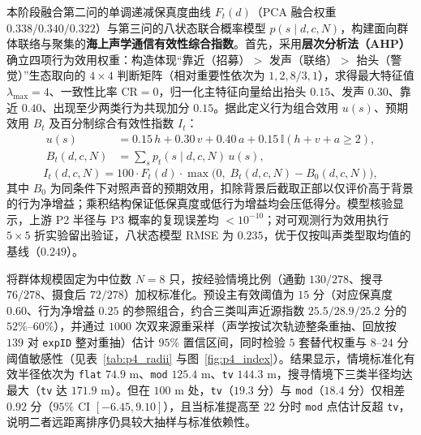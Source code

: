 \documentclass{apmcmthesis}
\begin{document}
本阶段融合第二问的单调递减保真度曲线 $F_t(d)$（PCA 融合权重 $0.338 / 0.340 / 0.322$）与第三问的八状态联合概率模型 $p(s \mid d, c, N)$，构建面向群体联络与聚集的\textbf{海上声学通信有效性综合指数}。首先，采用\textbf{层次分析法（AHP）}确立四项行为效用权重：构造体现``靠近（招募）$>$ 发声（联络）$>$ 抬头（警觉）''生态取向的 $4 \times 4$ 判断矩阵（相对重要性依次为 $1, 2, 8/3, 1$），求得最大特征值 $\lambda_{\max} = 4$、一致性比率 $\text{CR} = 0$，归一化主特征向量给出抬头 $0.15$、发声 $0.30$、靠近 $0.40$、出现至少两类行为共现加分 $0.15$。据此定义行为组合效用 $u(s)$、预期效用 $B_t$ 及百分制综合有效性指数 $I_t$：
\begin{equation}\label{eq:p4_index}
    \begin{aligned}
        u(s) &= 0.15\,h + 0.30\,v + 0.40\,a + 0.15\,\mathbb{I}(h + v + a \ge 2), \\
        B_t(d, c, N) &= \sum_{s} p_t(s \mid d, c, N)\,u(s),
    \end{aligned}
\end{equation}
\begin{equation}\label{eq:p4_score}
    I_t(d, c, N) = 100 \cdot F_t(d) \cdot \max\bigl(0,\; B_t(d, c, N) - B_0(d, c, N)\bigr),
\end{equation}
其中 $B_0$ 为同条件下对照声音的预期效用，扣除背景后截取正部以仅评价高于背景的行为净增益；乘积结构保证低保真度或低行为增益均会压低得分。模型核验显示，上游 P2 半径与 P3 概率的复现误差均 $< 10^{-10}$；对可观测行为效用执行 $5 \times 5$ 折实验留出验证，八状态模型 RMSE 为 $0.235$，优于仅按叫声类型取均值的基线（$0.249$）。

将群体规模固定为中位数 $N = 8$ 只，按经验情境比例（通勤 $130/278$、搜寻 $76/278$、摄食后 $72/278$）加权标准化。预设主有效阈值为 $15$ 分（对应保真度 $0.60$、行为净增益 $0.25$ 的参照组合，约合三类叫声近源指数 $25.5 / 28.9 / 25.2$ 分的 $52\%\text{--}60\%$），并通过 $1000$ 次双来源重采样（声学按试次轨迹整条重抽、回放按 $139$ 对 \texttt{expID} 整对重抽）估计 $95\%$ 置信区间，同时检验 $5$ 套替代权重与 $8\text{--}24$ 分阈值敏感性（见表~\ref{tab:p4_radii} 与图~\ref{fig:p4_index}）。结果显示，情境标准化有效半径依次为 \texttt{flat} $74.9\text{ m}$、\texttt{mod} $125.4\text{ m}$、\texttt{tv} $144.3\text{ m}$，搜寻情境下三类半径均达最大（\texttt{tv} 达 $171.9\text{ m}$）。但在 $100\text{ m}$ 处，\texttt{tv}（$19.3$ 分）与 \texttt{mod}（$18.4$ 分）仅相差 $0.92$ 分（$95\%$ CI $[-6.45, 9.10]$），且当标准提高至 $22$ 分时 \texttt{mod} 点估计反超 \texttt{tv}，说明二者远距离排序仍具较大抽样与标准依赖性。
\end{document}
